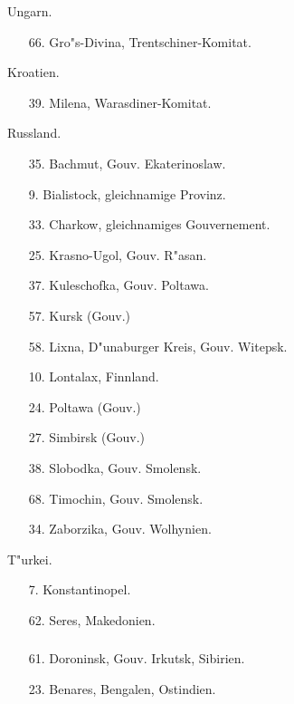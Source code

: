\documentclass[a4paper, 11pt, oneside, polutonikogreek, german]{article}
\begin{document}
\begin{center}
Ungarn.
\end{center}
\begin{itemize}
    
    \item[66.] Gro"s-Divina, Trentschiner-Komitat.
\end{itemize}
\begin{center}
Kroatien.
\end{center}
\begin{itemize}
    
    \item[39.] Milena, Warasdiner-Komitat.
\end{itemize}
\begin{center}
Russland.
\end{center}
\begin{itemize}
    
    \item[35.] Bachmut, Gouv. Ekaterinoslaw.
    \item[9.] Bialistock, gleichnamige Provinz.
    \item[33.] Charkow, gleichnamiges Gouvernement.
    \item[25.] Krasno-Ugol, Gouv. R"asan.
    \item[37.] Kuleschofka, Gouv. Poltawa.
    \item[57.] Kursk (Gouv.)
    \item[58.] Lixna, D"unaburger Kreis, Gouv. Witepsk.
    \item[10.] Lontalax, Finnland.
    \item[24.] Poltawa (Gouv.)
    \item[27.] Simbirsk (Gouv.)
    \item[38.] Slobodka, Gouv. Smolensk.
    \item[68.] Timochin, Gouv. Smolensk.
    \item[34.] Zaborzika, Gouv. Wolhynien.
\end{itemize}
\begin{center}
T"urkei.
\end{center}
\begin{itemize}
    
    \item[7.] Konstantinopel.
    \item[62.] Seres, Makedonien.
\end{itemize}
\subsubsection{}
\begin{itemize}
    
    \item[61.] Doroninsk, Gouv. Irkutsk, Sibirien.
    \item[23.] Benares, Bengalen, Ostindien.
\end{itemize}
\end{document}

